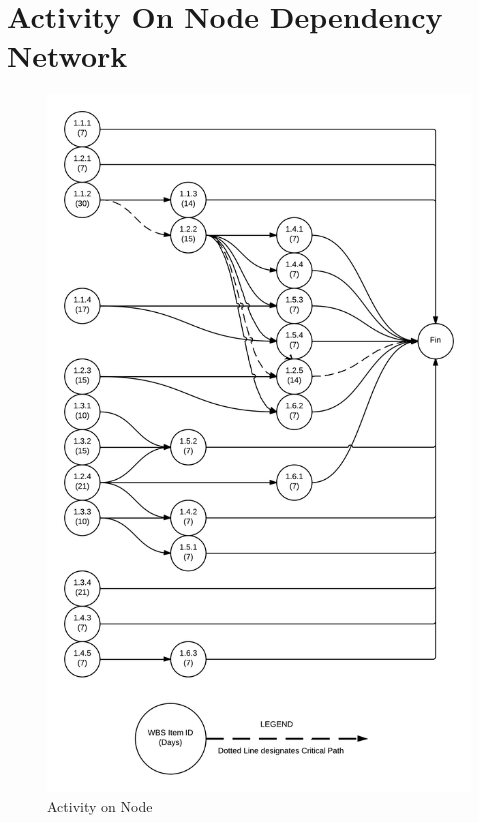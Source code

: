 \section{Activity On Node Dependency Network}
\begin{figure}[H]
\centering
\includegraphics[width=.75\textwidth]{AON.png}
\caption{Activity on Node}
\label{fig:Activity on Node}
\end{figure}
